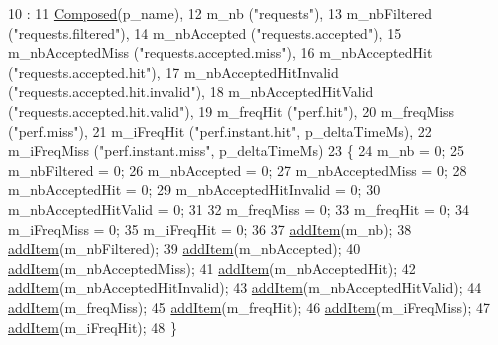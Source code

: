 \begin{DoxyCode}
10                                             :
11   \hyperlink{classxtd_1_1counters_1_1Cache_a93e934ad70d5b32b14beed5572450abf}{Composed}(p\_name),
12   m\_nb                   (\textcolor{stringliteral}{"requests"}),
13   m\_nbFiltered           (\textcolor{stringliteral}{"requests.filtered"}),
14   m\_nbAccepted           (\textcolor{stringliteral}{"requests.accepted"}),
15   m\_nbAcceptedMiss       (\textcolor{stringliteral}{"requests.accepted.miss"}),
16   m\_nbAcceptedHit        (\textcolor{stringliteral}{"requests.accepted.hit"}),
17   m\_nbAcceptedHitInvalid (\textcolor{stringliteral}{"requests.accepted.hit.invalid"}),
18   m\_nbAcceptedHitValid   (\textcolor{stringliteral}{"requests.accepted.hit.valid"}),
19   m\_freqHit              (\textcolor{stringliteral}{"perf.hit"}),
20   m\_freqMiss             (\textcolor{stringliteral}{"perf.miss"}),
21   m\_iFreqHit             (\textcolor{stringliteral}{"perf.instant.hit"}, p\_deltaTimeMs),
22   m\_iFreqMiss            (\textcolor{stringliteral}{"perf.instant.miss"}, p\_deltaTimeMs)
23 \{
24   m\_nb                   = 0;
25   m\_nbFiltered           = 0;
26   m\_nbAccepted           = 0;
27   m\_nbAcceptedMiss       = 0;
28   m\_nbAcceptedHit        = 0;
29   m\_nbAcceptedHitInvalid = 0;
30   m\_nbAcceptedHitValid   = 0;
31 
32   m\_freqMiss    = 0;
33   m\_freqHit     = 0;
34   m\_iFreqMiss   = 0;
35   m\_iFreqHit    = 0;
36 
37   \hyperlink{classxtd_1_1counters_1_1Composed_ac2efbce59510b352a2d47b3118e0d02a}{addItem}(m\_nb);
38   \hyperlink{classxtd_1_1counters_1_1Composed_ac2efbce59510b352a2d47b3118e0d02a}{addItem}(m\_nbFiltered);
39   \hyperlink{classxtd_1_1counters_1_1Composed_ac2efbce59510b352a2d47b3118e0d02a}{addItem}(m\_nbAccepted);
40   \hyperlink{classxtd_1_1counters_1_1Composed_ac2efbce59510b352a2d47b3118e0d02a}{addItem}(m\_nbAcceptedMiss);
41   \hyperlink{classxtd_1_1counters_1_1Composed_ac2efbce59510b352a2d47b3118e0d02a}{addItem}(m\_nbAcceptedHit);
42   \hyperlink{classxtd_1_1counters_1_1Composed_ac2efbce59510b352a2d47b3118e0d02a}{addItem}(m\_nbAcceptedHitInvalid);
43   \hyperlink{classxtd_1_1counters_1_1Composed_ac2efbce59510b352a2d47b3118e0d02a}{addItem}(m\_nbAcceptedHitValid);
44   \hyperlink{classxtd_1_1counters_1_1Composed_ac2efbce59510b352a2d47b3118e0d02a}{addItem}(m\_freqMiss);
45   \hyperlink{classxtd_1_1counters_1_1Composed_ac2efbce59510b352a2d47b3118e0d02a}{addItem}(m\_freqHit);
46   \hyperlink{classxtd_1_1counters_1_1Composed_ac2efbce59510b352a2d47b3118e0d02a}{addItem}(m\_iFreqMiss);
47   \hyperlink{classxtd_1_1counters_1_1Composed_ac2efbce59510b352a2d47b3118e0d02a}{addItem}(m\_iFreqHit);
48 \}
\end{DoxyCode}



